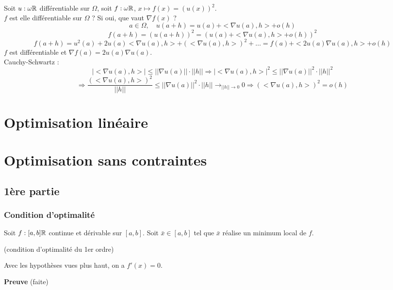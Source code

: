 		\begin{exemple}
		
		Soit $u: \omega \mathbb{R}$ différentiable sur $\Omega$, soit $f: \omega \mathbb{R}$, $ x \mapsto f(x) = (u(x))^2$.\\
		$f$ est elle différentiable sur $\Omega$ ? Si oui, que vaut $ \nabla f(x)$ ?
		\[a \in \Omega, \quad u(a+h) = u(a) + <\nabla u(a), h> + o(h)\]
		\[f(a+h) = (u(a+h))^2 = (u(a) + <\nabla u(a), h> + o(h))^2 \]
		\[f(a+h) = u^2(a) + 2u(a)<\nabla u(a), h> +(<\nabla u(a), h>)^2 + \dots = f(a) + <2u(a)\nabla u(a), h> + o(h)\]
		$f$ est différentiable et $\nabla f(a) = 2u(a) \nabla u(a)$.\\
		Cauchy-Schwartz : \[|<\nabla u(a), h>| \leq ||\nabla u(a)|| \cdot ||h|| \Rightarrow |<\nabla u(a), h>|^2 \leq ||\nabla u(a)||^2 \cdot ||h||^2 \]
		\[ \Rightarrow \frac{ (<\nabla u(a), h>)^2 }{||h||} \leq ||\nabla u(a)||^2 \cdot ||h|| \rightarrow_{||h|| \rightarrow 0} 0 \Rightarrow (< \nabla u(a), h>)^2 = o(h)\]
		\end{exemple}
		
\section{Optimisation linéaire}
		
		
\section{Optimisation sans contraintes}

	\subsection{1ère partie}
	
		\subsubsection{Condition d'optimalité}
		
		Soit $f : [a, b] \mathbb{R}$ continue et dérivable sur $[a,  b]$.
		Soit $\bar{x} \in [a, b]$ tel que $\bar{x}$ réalise un minimum local de $f$.
		
		\begin{theoreme} (condition d'optimalité du 1er ordre)
		
		Avec les hypothèses vues plus haut, on a $f'(x) = 0$.
		\end{theoreme}
		
		\textbf{Preuve} (faite)
		
